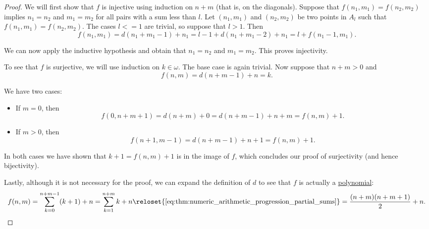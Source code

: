 \begin{proof}
  We will first show that \( f \) is injective using induction on \( n + m \) (that is, on the diagonals). Suppose that \( f(n_1, m_1) = f(n_2, m_2) \) implies \( n_1 = n_2 \) and \( m_1 = m_2 \) for all pairs with a sum less than \( l \). Let \( (n_1, m_1) \) and \( (n_2, m_2) \) be two points in \( A_l \) such that \( f(n_1, m_1) = f(n_2, m_2) \). The cases \( l <= 1 \) are trivial, so suppose that \( l > 1 \). Then
  \begin{equation*}
    f(n_1, m_1)
    =
    d(n_1 + m_1 - 1) + n_1
    =
    l - 1 + d(n_1 + m_1 - 2) + n_1
    =
    l + f(n_1 - 1, m_1).
  \end{equation*}

  We can now apply the inductive hypothesis and obtain that \( n_1 = n_2 \) and \( m_1 = m_2 \). This proves injectivity.

  To see that \( f \) is surjective, we will use induction on \( k \in \omega \). The base case is again trivial. Now suppose that \( n + m > 0 \) and
  \begin{equation*}
    f(n, m) = d(n + m - 1) + n = k.
  \end{equation*}

  We have two cases:
  \begin{itemize}
    \item If \( m = 0 \), then
    \begin{equation*}
      f(0, n + m + 1) = d(n + m) + 0 = d(n + m - 1) + n + m = f(n, m) + 1.
    \end{equation*}

    \item If \( m > 0 \), then
    \begin{equation*}
      f(n + 1, m - 1) = d(n + m - 1) + n + 1 = f(n, m) + 1.
    \end{equation*}
  \end{itemize}

  In both cases we have shown that \( k + 1 = f(n, m) + 1 \) is in the image of \( f \), which concludes our proof of surjectivity (and hence bijectivity).

  Lastly, although it is not necessary for the proof, we can expand the definition of \( d \) to see that \( f \) is actually a \hyperref[def:polynomial_algebra/polynomials]{polynomial}:
  \begin{equation*}
    f(n, m)
    =
    \sum_{k=0}^{n + m - 1} (k + 1) + n
    =
    \sum_{k=1}^{n + m} k + n
    \reloset {\eqref{eq:thm:numeric_arithmetic_progression_partial_sums}} =
    \frac {(n + m) (n + m + 1)} 2 + n.
  \end{equation*}


\end{proof}
